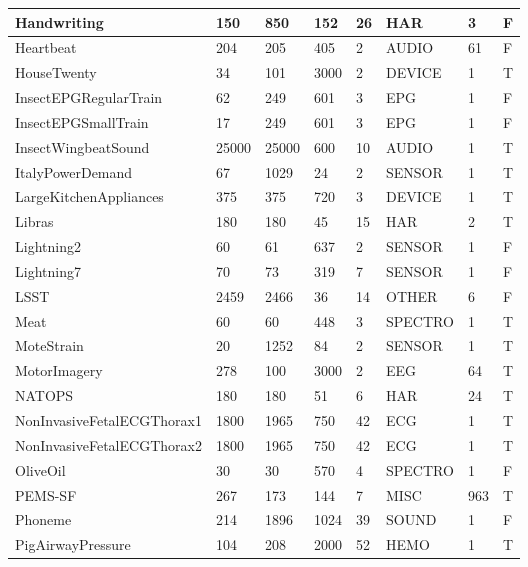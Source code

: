 \begin{landscape}
\begin{longtable}{|*{8}l|}
        \hline
        Handwriting & 150 & 850 & 152 & 26 & HAR & 3 & F \\
        \hline
        Heartbeat & 204 & 205 & 405 & 2 & AUDIO & 61 & F \\
        \hline
        HouseTwenty & 34 & 101 & 3000 & 2 & DEVICE & 1 & T \\
        \hline
        InsectEPGRegularTrain & 62 & 249 & 601 & 3 & EPG & 1 & F \\
        \hline
        InsectEPGSmallTrain & 17 & 249 & 601 & 3 & EPG & 1 & F \\
        \hline
        InsectWingbeatSound & 25000 & 25000 & 600 & 10 & AUDIO & 1 & T \\
        \hline
        ItalyPowerDemand & 67 & 1029 & 24 & 2 & SENSOR & 1 & T \\
        \hline
        LargeKitchenAppliances & 375 & 375 & 720 & 3 & DEVICE & 1 & T \\
        \hline
        Libras & 180 & 180 & 45 & 15 & HAR & 2 & T \\
        \hline
        Lightning2 & 60 & 61 & 637 & 2 & SENSOR & 1 & F \\
        \hline
        Lightning7 & 70 & 73 & 319 & 7 & SENSOR & 1 & F \\
        \hline
        LSST & 2459 & 2466 & 36 & 14 & OTHER & 6 & F \\
        \hline
        Meat & 60 & 60 & 448 & 3 & SPECTRO & 1 & T \\
        \hline
        MoteStrain & 20 & 1252 & 84 & 2 & SENSOR & 1 & T \\
        \hline
        MotorImagery & 278 & 100 & 3000 & 2 & EEG & 64 & T \\
        \hline
        NATOPS & 180 & 180 & 51 & 6 & HAR & 24 & T \\
        \hline
        NonInvasiveFetalECGThorax1 & 1800 & 1965 & 750 & 42 & ECG & 1 & T \\
        \hline
        NonInvasiveFetalECGThorax2 & 1800 & 1965 & 750 & 42 & ECG & 1 & T \\
        \hline
        OliveOil & 30 & 30 & 570 & 4 & SPECTRO & 1 & F \\
        \hline
        PEMS-SF & 267 & 173 & 144 & 7 & MISC & 963 & T \\
        \hline
        Phoneme & 214 & 1896 & 1024 & 39 & SOUND & 1 & F \\
        \hline
        PigAirwayPressure & 104 & 208 & 2000 & 52 & HEMO & 1 & T \\
        \hline

\end{longtable}
\end{landscape}
